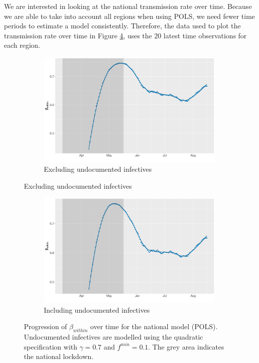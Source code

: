\documentclass[12pt]{article}
\begin{document}
	We are interested in looking at the national transmission rate over time. Because we are able to take into account all regions when using POLS, we need fewer time periods to estimate a model consistently. Therefore, the data used to plot the transmission rate over time in Figure \ref{fig:beta_within_over_time_national}, uses the 20 latest time observations for each region.
	
	\begin{figure}[H]
	    \centering
	    \begin{subfigure}{\textwidth}
	      \centering
	      \includegraphics[width=0.94\linewidth]{output/model_within_lag14_betawithin_National_rolling.pdf}
	      \caption{Excluding undocumented infectives}
	      \label{fig:beta_within_over_time_national_regular}
	    \end{subfigure}\newline
    \end{figure}
    \begin{figure}[H]\ContinuedFloat
	    \begin{subfigure}{\textwidth}
	      \centering
	      \includegraphics[width=0.94\linewidth]{output/model_within_lag14_betawithin_National_UndocQuadratic_rolling.pdf}
	      \caption{Including undocumented infectives}
	      \label{fig:beta_within_over_time_national_regular_undoc}
	    \end{subfigure}
	    \caption{Progression of $\beta_{within}$ over time for the national model (POLS). Undocumented infectives are modelled using the quadratic specification with $\gamma = 0.7$ and $f^{min}=0.1$. The grey area indicates the national lockdown.}
	    \label{fig:beta_within_over_time_national}
    \end{figure}
	
\end{document}
